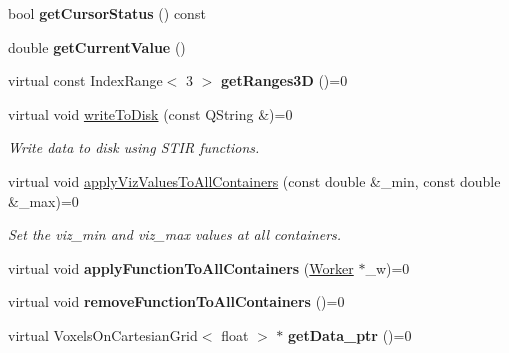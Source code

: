 \begin{DoxyCompactItemize}
\mbox{\label{classScreen__manager_afb1943d5f00971d44c607a35d2f14400}} 
bool {\bfseries get\+Cursor\+Status} () const
\item 
\mbox{\label{classScreen__manager_a2f34df85df98b630cc76c44f95191b0c}} 
double {\bfseries get\+Current\+Value} ()
\item 
\mbox{\label{classScreen__manager_ae6a57554e55917af3be9d57b903e5705}} 
virtual const Index\+Range$<$ 3 $>$ {\bfseries get\+Ranges3D} ()=0
\item 
\mbox{\label{classScreen__manager_a34e5e5c557ba96660e7fefd09647952e}} 
virtual void \mbox{\hyperlink{classScreen__manager_a34e5e5c557ba96660e7fefd09647952e}{write\+To\+Disk}} (const Q\+String \&)=0
\begin{DoxyCompactList}\small\item\em Write data to disk using S\+T\+IR functions. \end{DoxyCompactList}\item 
\mbox{\label{classScreen__manager_ae1be547f78a67154e879922d953fb500}} 
virtual void \mbox{\hyperlink{classScreen__manager_ae1be547f78a67154e879922d953fb500}{apply\+Viz\+Values\+To\+All\+Containers}} (const double \&\+\_\+min, const double \&\+\_\+max)=0
\begin{DoxyCompactList}\small\item\em Set the viz\+\_\+min and viz\+\_\+max values at all containers. \end{DoxyCompactList}\item 
\mbox{\label{classScreen__manager_ac89b57e0751e9a9c65e620b0f0ea04ab}} 
virtual void {\bfseries apply\+Function\+To\+All\+Containers} (\mbox{\hyperlink{classWorker}{Worker}} $\ast$\+\_\+w)=0
\item 
\mbox{\label{classScreen__manager_a8f1b65a9a4683531a81006ff90f0784a}} 
virtual void {\bfseries remove\+Function\+To\+All\+Containers} ()=0
\item 
\mbox{\label{classScreen__manager_a561aa42a8717049bd6f481d0e28e1a05}} 
virtual Voxels\+On\+Cartesian\+Grid$<$ float $>$ $\ast$ {\bfseries get\+Data\+\_\+ptr} ()=0
\end{DoxyCompactItemize}
